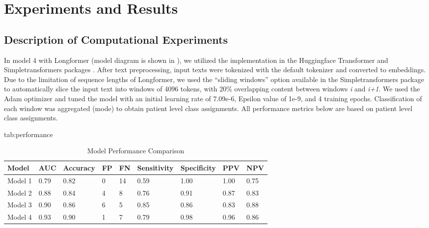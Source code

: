 \documentclass[pmlr,twocolumn]{jmlr} %
\begin{document}
\section{Experiments and Results}
\label{sec:experiments}

\subsection{Description of Computational Experiments}
 In model 4 with Longformer (model diagram is shown in ), we utilized the implementation in the Huggingface Transformer \citep{Wolf2019HuggingFacesTS} and Simpletransformers packages \citep{simple2020thilina}. After text preprocessing, input texts were tokenized with the default tokenizer and converted to embeddings. Due to the limitation of sequence lengths of Longformer, we used the “sliding windows” option available in the Simpletransformers package to automatically slice the input text into windows of 4096 tokens, with 20\% overlapping content between windows \emph{i} and \emph{i+1}. We used the Adam optimizer \citep{kingma2014adam} and tuned the model with an initial learning rate of 7.09e-6, Epsilon value of 1e-9, and 4 training epochs. Classification of each window was aggregated (mode) to obtain patient level class assignments. All performance metrics below are based on patient level class assignments.  

\begin{table*}[hbtp]
\floatconts
  {tab:performance}
  {\caption{Model Performance Comparison}}
  {\begin{tabular}{lllllllll}
  \toprule
  \bfseries Model &\bfseries AUC& \bfseries Accuracy & \bfseries FP & \bfseries FN &\bfseries Sensitivity &\bfseries Specificity &\bfseries PPV &\bfseries NPV\\
  \midrule
  Model 1 & 0.79 & 0.82 & 0 & 14 & 0.59 & 1.00 & 1.00 & 0.75\\
  Model 2 & 0.88 & 0.84 & 4 & 8 & 0.76 & 0.91 & 0.87 & 0.83\\
  Model 3 & 0.90 & 0.86 & 6 & 5 & 0.85 & 0.86 & 0.83 & 0.88\\
  Model 4 & 0.93 & 0.90 & 1 & 7 & 0.79 & 0.98 & 0.96 & 0.86\\
  \bottomrule
  \end{tabular}}
\end{table*}
\end{document}
